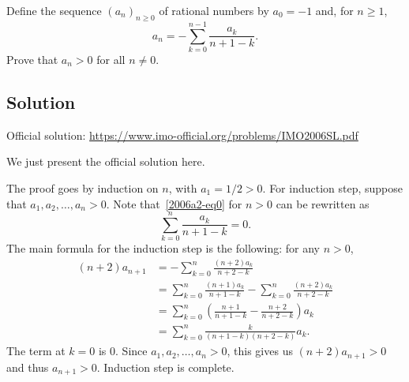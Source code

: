 Define the sequence $(a_n)_{n \geq 0}$ of rational numbers by $a_0 = -1$ and, for $n \geq 1$,
\[ a_n = -\sum_{k = 0}^{n - 1} \frac{a_k}{n + 1 - k}. \tag{*}\label{2006a2-eq0} \]
Prove that $a_n > 0$ for all $n \neq 0$.



\subsection*{Solution}

Official solution: \url{https://www.imo-official.org/problems/IMO2006SL.pdf}

We just present the official solution here.

The proof goes by induction on $n$, with $a_1 = 1/2 > 0$.
For induction step, suppose that $a_1, a_2, \ldots, a_n > 0$.
Note that~\eqref{2006a2-eq0} for $n > 0$ can be rewritten as
\[ \sum_{k = 0}^n \frac{a_k}{n + 1 - k} = 0. \]
The main formula for the induction step is the following: for any $n > 0$,
\begin{align*}
    (n + 2) a_{n + 1}
    &= -\sum_{k = 0}^n \frac{(n + 2) a_k}{n + 2 - k} \\
    &= \sum_{k = 0}^n \frac{(n + 1) a_k}{n + 1 - k} - \sum_{k = 0}^n \frac{(n + 2) a_k}{n + 2 - k} \\
    &= \sum_{k = 0}^n \left(\frac{n + 1}{n + 1 - k} - \frac{n + 2}{n + 2 - k}\right) a_k \\
    &= \sum_{k = 0}^n \frac{k}{(n + 1 - k)(n + 2 - k)} a_k.
\end{align*}
The term at $k = 0$ is $0$.
Since $a_1, a_2, \ldots, a_n > 0$, this gives us $(n + 2) a_{n + 1} > 0$ and thus $a_{n + 1} > 0$.
Induction step is complete.
